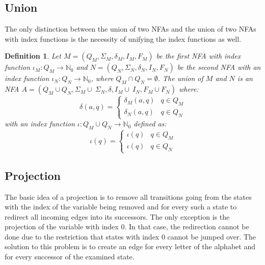 \documentclass[pdflatex,sn-mathphys-num]{sn-jnl}%
\theoremstyle{thmstyleone}%
\theoremstyle{thmstyletwo}%
\theoremstyle{thmstylethree}%
\newtheorem{definition}{Definition}%
\begin{document}
    \subsection{Union}
        The only distinction between the union of two NFAs and the union of two NFAs with index functions is the necessity of unifying the index functions as well.

        \vspace*{0.5em}

        \begin{definition}
            Let $M = (Q_M, \Sigma_M, \delta_M, I_M, F_M)$ be the first NFA with index function $\iota_M : Q_M \rightarrow \mathbb{N}_0$ and $N = (Q_N, \Sigma_N, \delta_N, I_N, F_N)$ be the second NFA with an index function $\iota_N : Q_N \rightarrow \mathbb{N}_0$, where $Q_M \cap Q_N = \emptyset$. The union of $M$ and $N$ is an NFA $A = (Q_M \cup Q_N, \Sigma_M \cup~\Sigma_N, \delta, I_M \cup~I_N, F_M \cup F_N)$ where:
            $$
            \delta(a, q) =
            \begin{cases}
                \delta_M(a, q) & q \in Q_M\\
                \delta_N(a, q) & q \in Q_N
            \end{cases}
            $$
            with an  index function $\iota : Q_M \cup Q_N \rightarrow \mathbb{N}_0$ defined as:
            $$
            \iota(q) =
            \begin{cases}
                \iota(q) & q \in Q_M\\
                \iota(q) & q \in Q_N
            \end{cases}
            $$
        \end{definition}

    \subsection{Projection}
        The basic idea of a projection is to remove all transitions going from the states with the index of the variable being removed and for every such a state to redirect all incoming edges into its successors. The only exception is the projection of the variable with index 0. In that case, the redirection cannot be done due to the restriction that states with index 0 cannot be jumped over. The solution to this problem is to create an edge for every letter of the alphabet and for every successor of the examined state.
\end{document}
